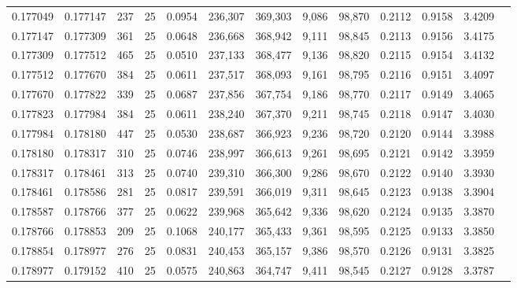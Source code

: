 \begin{tabular}{rrrrrrrrrrrrr}
0.177049 & 0.177147 &   237 &  25 &                                     0.0954 & 236,307 & 369,303 &   9,086 &  98,870 & 0.2112 & 0.9158 & 3.4209 \\
0.177147 & 0.177309 &   361 &  25 &                                     0.0648 & 236,668 & 368,942 &   9,111 &  98,845 & 0.2113 & 0.9156 & 3.4175 \\
0.177309 & 0.177512 &   465 &  25 &                                     0.0510 & 237,133 & 368,477 &   9,136 &  98,820 & 0.2115 & 0.9154 & 3.4132 \\
0.177512 & 0.177670 &   384 &  25 &                                     0.0611 & 237,517 & 368,093 &   9,161 &  98,795 & 0.2116 & 0.9151 & 3.4097 \\
0.177670 & 0.177822 &   339 &  25 &                                     0.0687 & 237,856 & 367,754 &   9,186 &  98,770 & 0.2117 & 0.9149 & 3.4065 \\
0.177823 & 0.177984 &   384 &  25 &                                     0.0611 & 238,240 & 367,370 &   9,211 &  98,745 & 0.2118 & 0.9147 & 3.4030 \\
0.177984 & 0.178180 &   447 &  25 &                                     0.0530 & 238,687 & 366,923 &   9,236 &  98,720 & 0.2120 & 0.9144 & 3.3988 \\
0.178180 & 0.178317 &   310 &  25 &                                     0.0746 & 238,997 & 366,613 &   9,261 &  98,695 & 0.2121 & 0.9142 & 3.3959 \\
0.178317 & 0.178461 &   313 &  25 &                                     0.0740 & 239,310 & 366,300 &   9,286 &  98,670 & 0.2122 & 0.9140 & 3.3930 \\
0.178461 & 0.178586 &   281 &  25 &                                     0.0817 & 239,591 & 366,019 &   9,311 &  98,645 & 0.2123 & 0.9138 & 3.3904 \\
0.178587 & 0.178766 &   377 &  25 &                                     0.0622 & 239,968 & 365,642 &   9,336 &  98,620 & 0.2124 & 0.9135 & 3.3870 \\
0.178766 & 0.178853 &   209 &  25 &                                     0.1068 & 240,177 & 365,433 &   9,361 &  98,595 & 0.2125 & 0.9133 & 3.3850 \\
0.178854 & 0.178977 &   276 &  25 &                                     0.0831 & 240,453 & 365,157 &   9,386 &  98,570 & 0.2126 & 0.9131 & 3.3825 \\
0.178977 & 0.179152 &   410 &  25 &                                     0.0575 & 240,863 & 364,747 &   9,411 &  98,545 & 0.2127 & 0.9128 & 3.3787 \\

\end{tabular}
